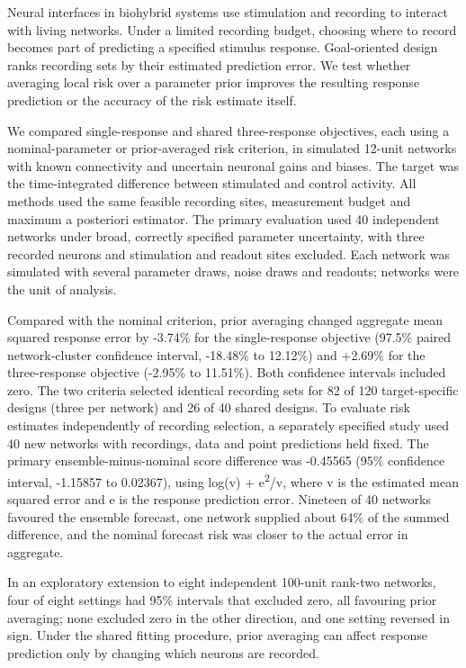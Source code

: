 Neural interfaces in biohybrid systems use stimulation and recording to interact with living networks. Under a limited recording budget, choosing where to record becomes part of predicting a specified stimulus response. Goal-oriented design ranks recording sets by their estimated prediction error. We test whether averaging local risk over a parameter prior improves the resulting response prediction or the accuracy of the risk estimate itself.

We compared single-response and shared three-response objectives, each using a nominal-parameter or prior-averaged risk criterion, in simulated 12-unit networks with known connectivity and uncertain neuronal gains and biases. The target was the time-integrated difference between stimulated and control activity. All methods used the same feasible recording sites, measurement budget and maximum a posteriori estimator. The primary evaluation used 40 independent networks under broad, correctly specified parameter uncertainty, with three recorded neurons and stimulation and readout sites excluded. Each network was simulated with several parameter draws, noise draws and readouts; networks were the unit of analysis.

Compared with the nominal criterion, prior averaging changed aggregate mean squared response error by -3.74\% for the single-response objective (97.5\% paired network-cluster confidence interval, -18.48\% to 12.12\%) and +2.69\% for the three-response objective (-2.95\% to 11.51\%). Both confidence intervals included zero. The two criteria selected identical recording sets for 82 of 120 target-specific designs (three per network) and 26 of 40 shared designs. To evaluate risk estimates independently of recording selection, a separately specified study used 40 new networks with recordings, data and point predictions held fixed. The primary ensemble-minus-nominal score difference was -0.45565 (95\% confidence interval, -1.15857 to 0.02367), using log(v) + e\textsuperscript{2}/v, where v is the estimated mean squared error and e is the response prediction error. Nineteen of 40 networks favoured the ensemble forecast, one network supplied about 64\% of the summed difference, and the nominal forecast risk was closer to the actual error in aggregate.

In an exploratory extension to eight independent 100-unit rank-two networks, four of eight settings had 95\% intervals that excluded zero, all favouring prior averaging; none excluded zero in the other direction, and one setting reversed in sign. Under the shared fitting procedure, prior averaging can affect response prediction only by changing which neurons are recorded.
